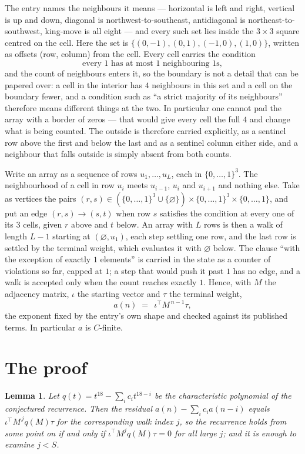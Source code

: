 \documentclass[11pt,a4paper]{article}
\theoremstyle{plain}
\newtheorem{lemma}[theorem]{Lemma}
\theoremstyle{definition}
\begin{document}
The entry names the neighbours it means --- horizontal is left and right, vertical is up and
down, diagonal is northwest-to-southeast, antidiagonal is northeast-to-southwest, king-move is
all eight --- and every such set lies inside the $3\times3$ square centred on the cell. Here
the set is $\{(0,-1), (0,1), (-1,0), (1,0)\}$, written as offsets (row, column) from the cell. Every cell carries
the condition
\[
\text{every 1 has at most 1 neighbouring 1s},
\]
and the count of neighbours enters it, so the boundary is not a detail that can be papered
over: a cell in the interior has $4$ neighbours in this set and a cell on the boundary
fewer, and a condition such as ``a strict majority of its neighbours'' therefore means
different things at the two. In particular one cannot pad the array with a border of zeros ---
that would give every cell the full $4$ and change what is being counted. The outside is
therefore carried
explicitly, as a sentinel row above the first and below the last and as a sentinel column
either side, and a neighbour that falls outside is simply absent from both counts.

Write an array as a sequence of rows $u_1,\dots,u_L$, each in
$\{0,\dots,1\}^{3}$. The neighbourhood of a cell in row $u_i$ meets $u_{i-1}$,
$u_i$ and $u_{i+1}$ and nothing else. Take as vertices the pairs
$(r,s)\in(\{0,\dots,1\}^{3}\cup\{\varnothing\})\times\{0,\dots,1\}^{3} \times \{0,\dots,1\}$,
and put an edge $(r,s)\to(s,t)$ when row $s$ satisfies the condition at every one of its
$3$ cells, given $r$ above and $t$ below. An array with $L$ rows is then a walk of length
$L-1$ starting at $(\varnothing,u_1)$, each step settling one row, and the last row is
settled by the terminal weight, which evaluates it with $\varnothing$ below. The clause ``with the exception of exactly $1$ elements'' is carried in
the state as a counter of violations so far, capped at $1$; a step that would push it past
$1$ has no edge, and a walk is accepted only when the count reaches exactly $1$. Hence,
with $M$ the adjacency matrix, $\iota$ the starting vector and $\tau$ the terminal weight,
\[
a(n)\;=\;\,\iota^{\!\top}M^{\,n-1}\tau ,
\]
the exponent fixed by the entry's own shape and checked against its published terms. In
particular $a$ is $C$-finite.

\section{The proof}

\begin{lemma}\label{lem:crit}
Let $q(t)=t^{18}-\sum_i c_it^{18-i}$ be the characteristic polynomial of the
conjectured recurrence. Then the residual $a(n)-\sum_ic_ia(n-i)$ equals
$\iota^{\!\top}M^{\,j}q(M)\tau$ for the corresponding walk index $j$, so the
recurrence holds from some point on if and only if $\iota^{\!\top}M^{j}q(M)\tau=0$ for all
large $j$; and it is enough to examine $j<S$.
\end{lemma}
\end{document}
